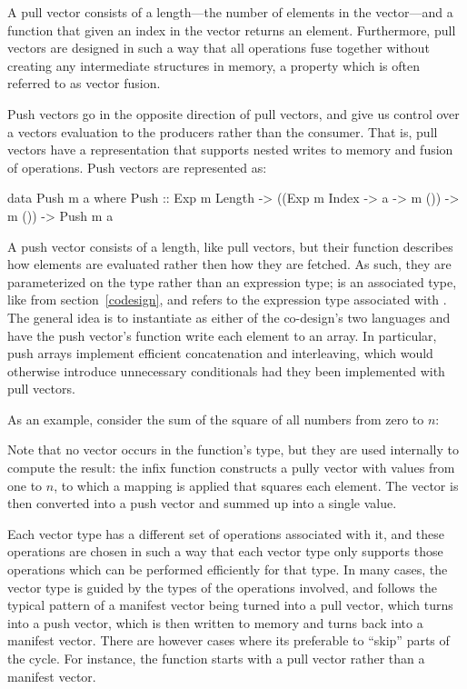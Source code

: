 \documentclass[../paper.tex]{subfiles}
\begin{document}
\noindent A pull vector consists of a length---the number of elements in the vector---and a function that given an index in the vector returns an element. Furthermore, pull vectors are designed in such a way that all operations fuse together without creating any intermediate structures in memory, a property which is often referred to as vector fusion.

Push vectors go in the opposite direction of pull vectors, and give us control over a vectors evaluation to the producers rather than the consumer. That is, pull vectors have a representation that supports nested writes to memory and fusion of operations. Push vectors are represented as:

\begin{code}
data Push m a where
  Push :: Exp m Length -> ((Exp m Index -> a -> m ()) -> m ()) -> Push m a
\end{code}

\noindent A push vector consists of a length, like pull vectors, but their function describes how elements are evaluated rather then how they are fetched. As such, they are parameterized on the type  rather than an expression type;  is an associated type, like  from section~\ref{codesign}, and refers to the expression type associated with . The general idea is to instantiate  as either of the co-design's two languages and have the push vector's function write each element to an array. In particular, push arrays implement efficient concatenation and interleaving, which would otherwise introduce unnecessary conditionals had they been implemented with pull vectors.

As an example, consider the sum of the square of all numbers from zero to $n$:


\noindent Note that no vector occurs in the function's type, but they are used internally to compute the result: the infix function  constructs a pully vector with values from one to $n$, to which a mapping is applied that squares each element. The vector is then converted into a push vector and summed up into a single value.

Each vector type has a different set of operations associated with it, and these operations are chosen in such a way that each vector type only supports those operations which can be performed efficiently for that type. In many cases, the vector type is guided by the types of the operations involved, and follows the typical pattern of a manifest vector being turned into a pull vector, which turns into a push vector, which is then written to memory and turns back into a manifest vector. There are however cases where its preferable to ``skip'' parts of the cycle. For instance, the  function starts with a pull vector rather than a manifest vector.
\end{document}
